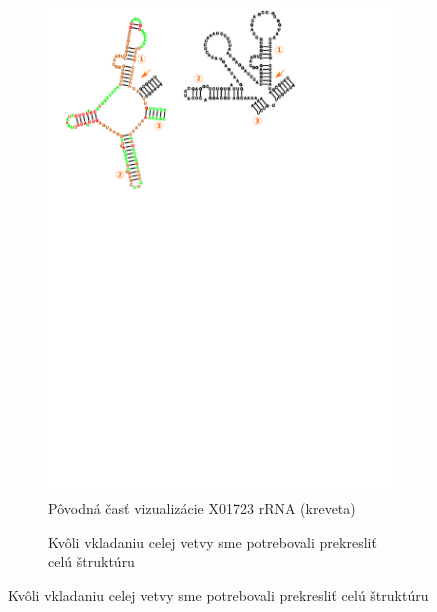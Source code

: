 \begin{figure}
  \begin{subfigure}{\wi}
    \caption{Pôvodná časť vizualizácie X01723 rRNA (kreveta)}
    \includegraphics[clip, trim=8cm 18cm 5cm 0, width=1\textwidth]{../img/alg/insert/multibranch-redraw}
  \end{subfigure}
  \begin{subfigure}{\wi}
    \caption{Kvôli vkladaniu celej vetvy sme potrebovali prekresliť celú štruktúru}

\end{subfigure}
\end{figure}
